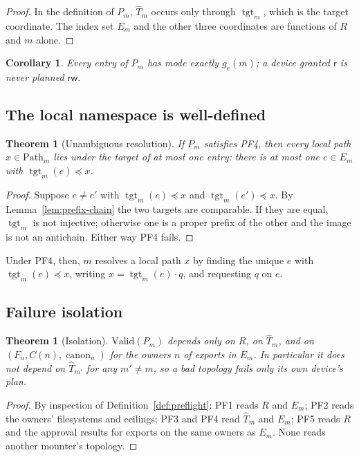 \documentclass[11pt]{article}
\newcommand{\Path}{\text{Path}}
\DeclareMathOperator{\canon}{canon}
\DeclareMathOperator{\tgt}{tgt}
\newcommand{\Rd}{\mathsf{r}}
\newcommand{\RW}{\mathsf{rw}}
\newcommand{\PF}[1]{\textsf{PF#1}}
\theoremstyle{definitionbreak}
\theoremstyle{plainbreak}
\newtheorem{theorem}[definition]{Theorem}
\newtheorem{corollary}[definition]{Corollary}
\theoremstyle{remarkbreak}
\begin{document}
\begin{proof}
In the definition of $P_m$, $\hat T_m$ occurs only through $\tgt_m$, which is the target
coordinate. The index set $E_m$ and the other three coordinates are functions of $R$ and $m$
alone.
\end{proof}

\begin{corollary}
Every entry of $P_m$ has mode exactly $g_e(m)$; a device granted $\Rd$ is never planned $\RW$.
\end{corollary}

\subsection{The local namespace is well-defined}

\begin{theorem}[Unambiguous resolution]\label{thm:resolve}
If $P_m$ satisfies \PF{4}, then every local path $x \in \Path_m$ lies under the target of at
most one entry: there is at most one $e \in E_m$ with $\tgt_m(e) \preceq x$.
\end{theorem}

\begin{proof}
Suppose $e \neq e'$ with $\tgt_m(e) \preceq x$ and $\tgt_m(e') \preceq x$. By
Lemma~\ref{lem:prefix-chain} the two targets are comparable. If they are equal, $\tgt_m$ is not
injective; otherwise one is a proper prefix of the other and the image is not an antichain.
Either way \PF{4} fails.
\end{proof}

Under \PF{4}, then, $m$ resolves a local path $x$ by finding the unique $e$ with
$\tgt_m(e) \preceq x$, writing $x = \tgt_m(e) \cdot q$, and requesting $q$ on $e$.

\subsection{Failure isolation}

\begin{theorem}[Isolation]\label{thm:isolation}
$\mathrm{Valid}(P_m)$ depends only on $R$, on $\hat T_m$, and on $(F_n, C(n), \canon_n)$ for
the owners $n$ of exports in $E_m$. In particular it does not depend on $\hat T_{m'}$ for any
$m' \neq m$, so a bad topology fails only its own device's plan.
\end{theorem}

\begin{proof}
By inspection of Definition~\ref{def:preflight}: \PF{1} reads $R$ and $E_m$; \PF{2} reads the
owners' filesystems and ceilings; \PF{3} and \PF{4} read $\hat T_m$ and $E_m$; \PF{5} reads
$R$ and the approval results for exports on the same owners as $E_m$. None reads another
mounter's topology.
\end{proof}
\end{document}
